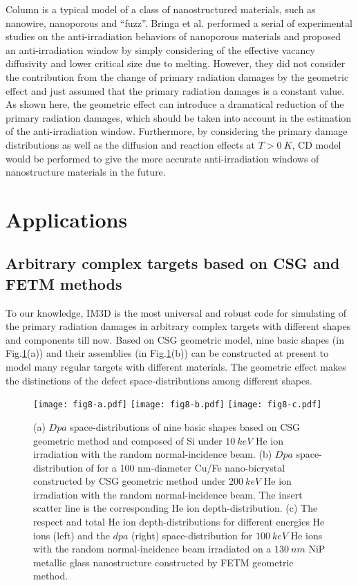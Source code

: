 Column is a typical model of a class of nanostructured materials, such as nanowire, nanoporous and ``fuzz''. Bringa et al. performed a serial of experimental studies on the anti-irradiation behaviors of nanoporous materials and proposed an anti-irradiation window by simply considering of the effective vacancy diffusivity and lower critical size due to melting. However, they did not consider the contribution from the change of primary radiation damages by the geometric effect and just assumed that the primary radiation damages is a constant value. As shown here, the geometric effect can introduce a dramatical reduction of the primary radiation damages, which should be taken into account in the estimation of the anti-irradiation window. Furthermore, by considering the primary damage distributions as well as the diffusion and reaction effects at $T > 0~K$, CD model would be performed to give the more accurate anti-irradiation windows of nanostructure materials in the future.

\section{Applications}

\subsection{Arbitrary complex targets based on CSG and FETM methods}

To our knowledge, IM3D is the most universal and robust code for simulating of the primary radiation damages in arbitrary complex targets with different shapes and components till now. Based on CSG geometric model, nine basic shapes (in Fig.\ref{Fig.8}(a)) and their assemblies (in Fig.\ref{Fig.8}(b)) can be constructed at present to model many regular targets with different materials. The geometric effect makes the distinctions of the defect space-distributions among different shapes.

\begin{figure}[!ht]\centering
\texttt{[image: fig8-a.pdf]}
\texttt{[image: fig8-b.pdf]}
\texttt{[image: fig8-c.pdf]}
\caption{(a) $Dpa$ space-distributions of nine basic shapes based on CSG geometric method and composed of Si under $10~keV$ He ion irradiation with the random normal-incidence beam. (b) $Dpa$ space-distribution of for a 100 nm-diameter Cu/Fe nano-bicrystal constructed by CSG geometric method under $200~keV$ He ion irradiation with the random normal-incidence beam. The insert scatter line is the corresponding He ion depth-distribution. (c) The respect and total He ion depth-distributions for different energies He ions (left) and the $dpa$ (right) space-distribution for $100~keV$ He ions with the random normal-incidence beam irradiated on a $130~nm$ NiP metallic glass nanostructure constructed by FETM geometric method.} \label{Fig.8}
\end{figure}


